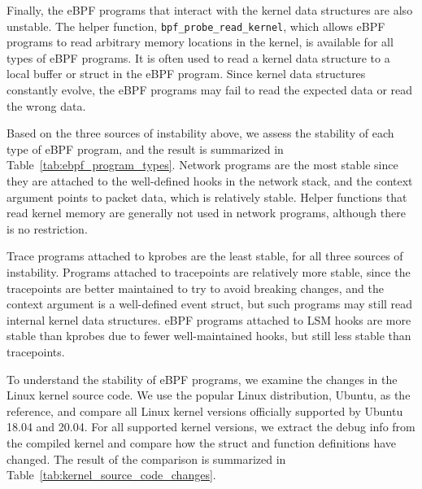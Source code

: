 Finally, the eBPF programs that interact with the kernel data structures are also unstable.
The helper function, \texttt{bpf\_probe\_read\_kernel},
which allows eBPF programs to read arbitrary memory locations in the kernel,
is available for all types of eBPF programs.
It is often used to read a kernel data structure to a local buffer or struct in the eBPF program.
Since kernel data structures constantly evolve, the eBPF programs may fail to read the expected data or read the wrong data.


Based on the three sources of instability above, we assess the stability of each type of eBPF program,
and the result is summarized in Table~\ref{tab:ebpf_program_types}.
Network programs are the most stable since they are attached to the well-defined hooks in the network stack,
and the context argument points to packet data, which is relatively stable.
Helper functions that read kernel memory are generally not used in network programs, although there is no restriction.

Trace programs attached to kprobes are the least stable, for all three sources of instability.
Programs attached to tracepoints are relatively more stable, since the tracepoints are better maintained to try to avoid breaking changes,
and the context argument is a well-defined event struct, but such programs may still read internal kernel data structures.
eBPF programs attached to LSM hooks are more stable than kprobes due to fewer well-maintained hooks, but still less stable than tracepoints.


To understand the stability of eBPF programs, we examine the changes in the Linux kernel source code.
We use the popular Linux distribution, Ubuntu, as the reference, and compare all Linux kernel versions officially supported by Ubuntu 18.04 and 20.04.
For all supported kernel versions, we extract the debug info from the compiled kernel and compare how the struct and function definitions have changed.
The result of the comparison is summarized in Table~\ref{tab:kernel_source_code_changes}.




